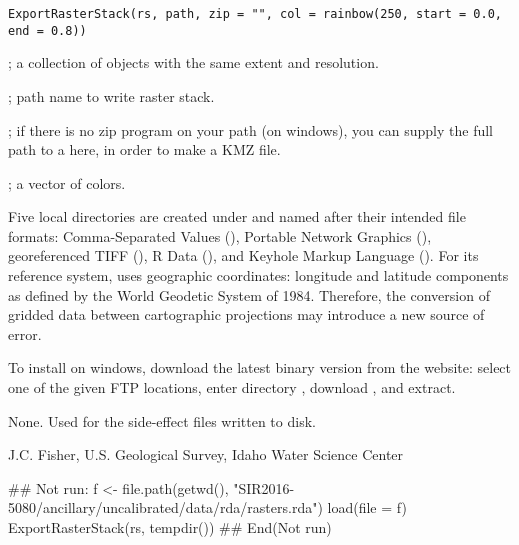 \documentclass[a4paper]{book}
\begin{document}
%
\begin{Usage}
\begin{verbatim}
ExportRasterStack(rs, path, zip = "", col = rainbow(250, start = 0.0, end = 0.8))
\end{verbatim}
\end{Usage}
%
\begin{Arguments}
\begin{ldescription}
\item[\code{rs}] ; a collection of  objects with the same extent and resolution.
\item[\code{path}] ; path name to write raster stack.
\item[\code{zip}] ; if there is no zip program on your path (on windows), you can supply the full path to a  here, in order to make a KMZ file.
\item[\code{col}] ; a vector of colors.
\end{ldescription}
\end{Arguments}
%
\begin{Details}\relax
Five local directories are created under  and named after their intended file formats:
Comma-Separated Values (),
Portable Network Graphics (),
georeferenced TIFF (),
R Data (),
and Keyhole Markup Language ().
For its reference system,  uses geographic coordinates: longitude and latitude components as defined by the World Geodetic System of 1984.
Therefore, the conversion of gridded data between cartographic projections may introduce a new source of error.

To install  on windows, download the latest binary version from the  website:
select one of the given FTP locations, enter directory , download , and extract.
\end{Details}
%
\begin{Value}
None. Used for the side-effect files written to disk.
\end{Value}
%
\begin{Author}\relax
J.C. Fisher, U.S. Geological Survey, Idaho Water Science Center
\end{Author}
%
\begin{SeeAlso}\relax
{}
\end{SeeAlso}
%
\begin{Examples}
\begin{ExampleCode}
## Not run: 
f <- file.path(getwd(), "SIR2016-5080/ancillary/uncalibrated/data/rda/rasters.rda")
load(file = f)
ExportRasterStack(rs, tempdir())
## End(Not run)
\end{ExampleCode}
\end{Examples}
\end{document}
